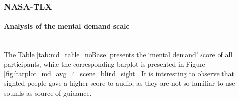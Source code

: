 \subsubsection{NASA-TLX}
\label{subsubsec:results_nasa_tlx_2}

\paragraph{Analysis of the mental demand scale}\mbox{}\\

The Table \ref{tab:md_table_noBase} presents the ‘mental demand’ score of all participants, while the corresponding barplot is presented in Figure \ref{fig:barplot_md_avg_4_scene_blind_sight}. It is interesting to observe that sighted people gave a higher score to audio, as they are not so familiar to use sounds as source of guidance.




